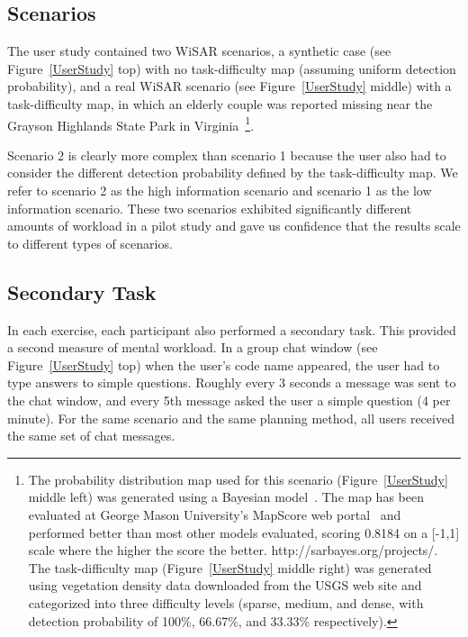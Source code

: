 \subsection{Scenarios}

The user study contained two WiSAR scenarios, a synthetic case (see Figure~\ref{UserStudy} top) with no task-difficulty map (assuming uniform detection probability), and a real WiSAR scenario (see Figure~\ref{UserStudy} middle) with a task-difficulty map, in which an elderly couple was reported missing near the Grayson Highlands State Park in Virginia~\cite{Koester2008Lost}\footnote{The probability distribution map used for this scenario (Figure~\ref{UserStudy} middle left) was generated using a Bayesian model~\cite{Lin2010Bayesian}. The map has been evaluated at George Mason University's MapScore web portal~\cite{Twardy2012MapScore} and performed better than most other models evaluated, scoring 0.8184 on a [-1,1] scale where the higher the score the better. http://sarbayes.org/projects/. The task-difficulty map (Figure~\ref{UserStudy} middle right) was generated using vegetation density data downloaded from the USGS web site and categorized into three difficulty levels (sparse, medium, and dense, with detection probability of 100\%, 66.67\%, and 33.33\% respectively).}.

Scenario 2 is clearly more complex than scenario 1 because the user also had to consider the different detection probability defined by the task-difficulty map. We refer to scenario 2 as the high information scenario and scenario 1 as the low information scenario. These two scenarios exhibited significantly different amounts of workload in a pilot study and gave us confidence that the results scale to different types of scenarios.

\subsection{Secondary Task}

In each exercise, each participant also performed a secondary task. This provided a second measure of mental workload. In a group chat window (see Figure~\ref{UserStudy} top) when the user's code name appeared, the user had to type answers to simple questions. Roughly every 3 seconds a message was sent to the chat window, and every 5th message asked the user a simple question (4 per minute). For the same scenario and the same planning method, all users received the same set of chat messages.


